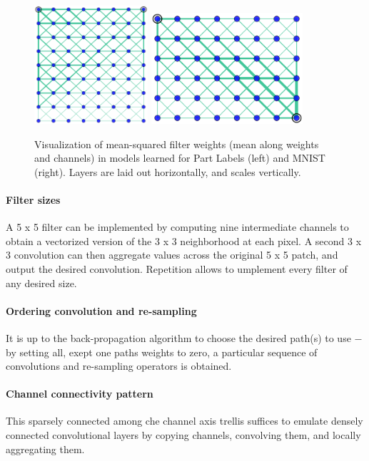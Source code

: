 \documentclass[a4paper,twocolumn]{article}
\begin{document}
\begin{figure}[t]
    \centering
    \includegraphics[width=0.375\textwidth]{fabrics2.png}
    \hskip 1cm 
    \includegraphics[width=0.5\textwidth]{fabrics3.png}
    \caption{Visualization of mean-squared filter weights (mean along weights and channels) in models learned for Part Labels (left) and MNIST (right). Layers are laid out horizontally, and scales vertically.}
\end{figure}

\paragraph{Filter sizes}
A 5 x 5 filter can be implemented by computing nine intermediate channels to obtain a vectorized version of the 3 x 3 neighborhood at each pixel. A second 3 x 3 convolution can then aggregate values across the original 5 x 5 patch, and output the desired convolution. Repetition allows to umplement every filter of any desired size.

\paragraph{Ordering convolution and re-sampling}
It is up to the back-propagation algorithm to choose the desired path(s) to use $-$ by setting all, exept one paths weights to zero, a particular sequence of convolutions and re-sampling operators is obtained.

\paragraph{Channel connectivity pattern}
This sparsely connected among che channel axis trellis suffices to emulate densely connected convolutional layers by copying channels, convolving them, and locally aggregating them.
\end{document}
